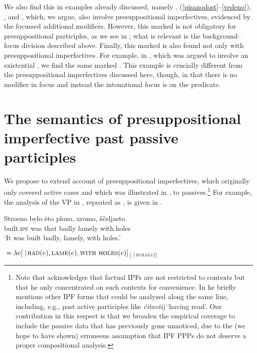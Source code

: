 \documentclass[output=paper,modfonts,newtxmath,hidelinks
\ChapterDOI{10.5281/zenodo.2545513}
]{langscibook}
\begin{document}
\noindent We also find this  in examples already discussed, namely , (\ref{pisanodost}--\ref{vedeno}), , and , which, we argue, also involve presuppositional imperfectives, evidenced by the focussed additional modifiers. However, this marked  is not obligatory for presuppositional  participles, as we see in ; what is relevant is the background--focus division described above. Finally, this marked  is also found not only with presuppositional imperfectives. For example, in , which was argued to involve an existential , we find the same marked . This example is crucially different from the presuppositional imperfectives discussed here, though, in that there is no modifier in focus and instead the intonational focus is on the predicate.

\section{The semantics of presuppositional imperfective past passive participles}
\label{analysis}

We propose to extend  account of presuppositional imperfectives, which originally only covered active cases and which was illustrated in , to passives.\footnote{Note that \citet{gronndiss} acknowledges that factual IPFs are not restricted to  contexts but that he only concentrated on such contexts for convenience. In \citet{gronn15} he briefly mentions other IPF forms that could be analyzed along the same line, including, e.g., past active participles like \textit{čitavšij} `having read'. Our contribution in this respect is that we broaden the empirical coverage to include the passive data that has previously gone unnoticed, due to the (we hope to have shown) erroneous assumption that IPF PPPs do not deserve a proper compositional analysis.} For example, the analysis of the VP in , repeated as , is given in .

\ea\gll	Stroeno bylo \.{e}to ploxo, xromo, ščeljasto.\\
	built.\textsc{ipf} was that badly lamely with.holes\\
    \glt	`It was built badly, lamely, with holes.'\label{ploxo}
    \z

\ea {}${}=\lambda e[ \hspace{0.3em}|\hspace{0.1em} \textsc{bad}(e), \textsc{lame}(e), \textsc{with holes}(e)]_{\hspace{2pt}[ \hspace{0.3em} |\hspace{0.1em}\textsc{build}(e)]}$\label{ploxoanalysis}
\z
\end{document}
